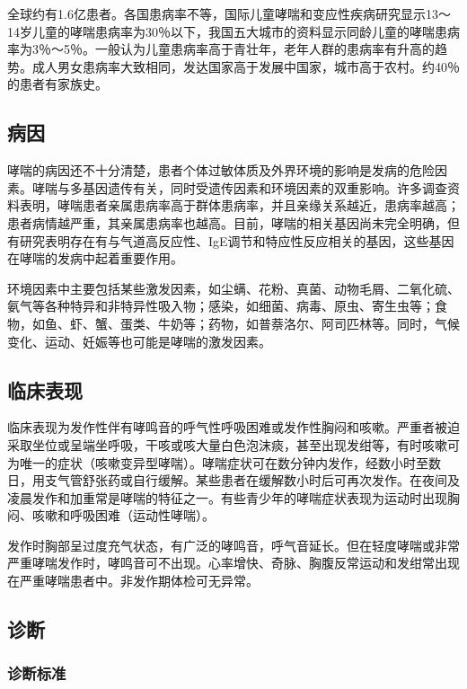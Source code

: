 全球约有1.6亿患者。各国患病率不等，国际儿童哮喘和变应性疾病研究显示13～14岁儿童的哮喘患病率为30％以下，我国五大城市的资料显示同龄儿童的哮喘患病率为3％～5％。一般认为儿童患病率高于青壮年，老年人群的患病率有升高的趋势。成人男女患病率大致相同，发达国家高于发展中国家，城市高于农村。约40％的患者有家族史。

\subsection{病因}

哮喘的病因还不十分清楚，患者个体过敏体质及外界环境的影响是发病的危险因素。哮喘与多基因遗传有关，同时受遗传因素和环境因素的双重影响。许多调查资料表明，哮喘患者亲属患病率高于群体患病率，并且亲缘关系越近，患病率越高；患者病情越严重，其亲属患病率也越高。目前，哮喘的相关基因尚未完全明确，但有研究表明存在有与气道高反应性、IgE调节和特应性反应相关的基因，这些基因在哮喘的发病中起着重要作用。

环境因素中主要包括某些激发因素，如尘螨、花粉、真菌、动物毛屑、二氧化硫、氨气等各种特异和非特异性吸入物；感染，如细菌、病毒、原虫、寄生虫等；食物，如鱼、虾、蟹、蛋类、牛奶等；药物，如普萘洛尔、阿司匹林等。同时，气候变化、运动、妊娠等也可能是哮喘的激发因素。

\subsection{临床表现}

临床表现为发作性伴有哮鸣音的呼气性呼吸困难或发作性胸闷和咳嗽。严重者被迫采取坐位或呈端坐呼吸，干咳或咳大量白色泡沫痰，甚至出现发绀等，有时咳嗽可为唯一的症状（咳嗽变异型哮喘）。哮喘症状可在数分钟内发作，经数小时至数日，用支气管舒张药或自行缓解。某些患者在缓解数小时后可再次发作。在夜间及凌晨发作和加重常是哮喘的特征之一。有些青少年的哮喘症状表现为运动时出现胸闷、咳嗽和呼吸困难（运动性哮喘）。

发作时胸部呈过度充气状态，有广泛的哮鸣音，呼气音延长。但在轻度哮喘或非常严重哮喘发作时，哮鸣音可不出现。心率增快、奇脉、胸腹反常运动和发绀常出现在严重哮喘患者中。非发作期体检可无异常。

\subsection{诊断}

\subsubsection{诊断标准}

